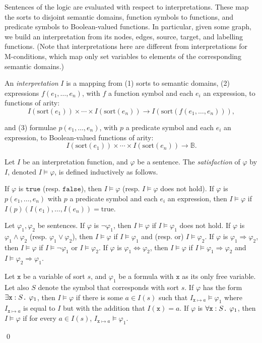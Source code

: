 \documentclass{llncs}
\newcommand{\mt}[1]{\text{\tt{#1}}}
\begin{document}
	Sentences of the logic are evaluated with respect to interpretations. These map the sorts to disjoint semantic domains, function symbols to functions, and predicate symbols to Boolean-valued functions. In particular, given some graph, we build an interpretation from its nodes, edges, source, target, and labelling functions. (Note that interpretations here are different from interpretations for M-conditions, which map only set variables to elements of the corresponding semantic domains.)


	\begin{definition}\label{defn:app:graph_structure}\label{defn:app:interpretation_function}\label{defn:app:satisfaction_structures}\rm
		An \emph{interpretation} $I$ is a mapping from (1) sorts to semantic domains, (2) expressions $f(e_1,\dots,e_n)$, with $f$ a function symbol and each $e_i$ an expression, to functions of arity:
	\[I(\text{sort}(e_1)) \times \cdots \times I(\text{sort}(e_n)) \rightarrow I(\text{sort}(f(e_1,\dots,e_n))),\]

	\noindent and (3) formulae $p(e_1,\dots,e_n)$, with $p$ a predicate symbol and each $e_i$ an expression, to Boolean-valued functions of arity:
	\[I(\text{sort}(e_1)) \times \cdots \times I(\text{sort}(e_n)) \rightarrow \mathbb{B}.\]


		Let $I$ be an interpretation function, and $\varphi$ be a sentence. The \emph{satisfaction} of $\varphi$ by $I$, denoted $I \models \varphi$, is defined inductively as follows.

		If $\varphi$ is $\mathtt{true}$ (resp. $\mathtt{false}$), then $I \models \varphi$ (resp. $I \models \varphi$ does not hold). If $\varphi$ is $p(e_1,\dots,e_n)$ with $p$ a predicate symbol and each $e_i$ an expression, then $I \models \varphi$ if $I(p)(I(e_1),\dots,I(e_n)) = \text{true}$.

		Let $\varphi_1,\varphi_2$ be sentences. If $\varphi$ is $\neg\varphi_1$, then $I \models \varphi$ if $I \models \varphi_1$ does not hold. If $\varphi$ is $\varphi_1 \wedge \varphi_2$ (resp. $\varphi_1 \vee \varphi_2$), then $I\models \varphi$ if $I\models \varphi_1$ and (resp. or) $I \models \varphi_2$. If $\varphi$ is $\varphi_1 \Rightarrow \varphi_2$, then $I\models \varphi$ if $I \models \neg \varphi_1$ or $I \models \varphi_2$. If $\varphi$ is $\varphi_1 \Leftrightarrow \varphi_2$, then $I\models \varphi$ if $I\models \varphi_1 \Rightarrow \varphi_2$ and $I\models \varphi_2 \Rightarrow \varphi_1$.

		Let $\mathtt{x}$ be a variable of sort $s$, and $\varphi_1$ be a formula with $\mathtt{x}$ as its only free variable. Let also $S$ denote the symbol that corresponds with sort $s$. If $\varphi$ has the form $\exists \mathtt{x}:S\mt{.}\ \varphi_1$, then $I \models \varphi$ if there is some $a\in I(s)$ such that $I_{\mathtt{x}\mapsto a} \models \varphi_1$ where $I_{\mathtt{x}\mapsto a}$ is equal to $I$ but with the addition that $I(\mathtt{x}) = a$. If $\varphi$ is $\forall \mathtt{x}:S\mt{.}\ \varphi_1$, then $I \models \varphi$ if for every $a\in I(s)$, $I_{\mathtt{x}\mapsto a} \models \varphi_1$.

	\qed
	\end{definition}
\end{document}
